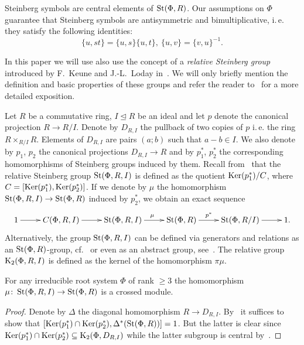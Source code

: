Steinberg symbols are central elements of $\operatorname{St}(\Phi, R)$.
Our assumptions on $\Phi$ guarantee that Steinberg symbols are antisymmetric and bimultiplicative, i.\,e. they satisfy the following identities:
\begin{equation} \label{eq:symbol-properties} \{ u, st \} = \{ u, s\} \{ u, t \}, \ \{ u, v \} = \{ v, u\}^{-1}. \end{equation}

In this paper we will use also use the concept of a \textit{relative Steinberg group} introduced by F.~Keune and J.-L.~Loday in~\cite{Ke78, Lo78}.
We will only briefly mention the definition and basic properties of these groups and refer the reader to~\cite[\S~2.3]{LS20} for a more detailed exposition.

Let $R$ be a commutative ring, $I \trianglelefteq R$ be an ideal and let $p$ denote the canonical projection $R \to R/I$.
Denote by $D_{R, I}$ the pullback of two copies of $p$ i.\,e. the ring $R \times_{R/I} R$.
Elements of $D_{R, I}$ are pairs $(a; b)$ such that $a-b \in I$.
We also denote by $p_1$, $p_2$ the canonical projections $D_{R, I} \to R$ and by $p_1^*$, $p_2^*$ the corresponding homomorphisms of Steinberg groups induced by them.
Recall from~\cite[Definition~2.5]{LS20} that the relative Steinberg group $\operatorname{St}(\Phi, R, I)$ is defined as the quotient
 $\operatorname{Ker}(p_1^*) / C$, where $C = [\operatorname{Ker}(p_1^*), \operatorname{Ker}(p_2^*)]$.
If we denote by $\mu$ the homomorphism $\operatorname{St}(\Phi, R, I) \to \operatorname{St}(\Phi, R)$ induced by $p_2^*$, we obtain an exact sequence
\begin{equation}
    \xymatrix{1 \ar[r] & C(\Phi, R, I) \ar[r] & \St(\Phi, R, I) \ar[r]^\mu & \St(\Phi, R) \ar[r]^-{p^*} & \St(\Phi, R/I) \ar[r] & 1. }\label{eq:relative-Steinberg}
\end{equation}
Alternatively, the group $\operatorname{St}(\Phi, R, I)$ can be defined via generators and relations as an $\operatorname{St}(\Phi, R)$-group, cf.~\cite[Proposition~6]{S15}
 or even as an abstract group, see~\cite{V22}.
The relative group $\operatorname{K}_2(\Phi, R, I)$ is defined as the kernel of the homomorphism $\pi \mu$.

\begin{lemma} \label{lem:rel-Steinberg-crossed-module}
For any irreducible root system $\Phi$ of rank $\geq 3$ the homomorphism $\mu \colon \operatorname{St}(\Phi, R, I) \to \operatorname{St}(\Phi, R)$ is a crossed module.
\end{lemma}
\begin{proof}
    Denote by $\Delta$ the diagonal homomorphism $R \to D_{R, I}.$
    By~\cite[Proposition~6]{Lo78} it suffices to show that $[\operatorname{Ker}(p_1^*) \cap \operatorname{Ker}(p_2^*), \Delta^*(\operatorname{St}(\Phi, R))] = 1$.
    But the latter is clear since $\operatorname{Ker}(p_1^*) \cap \operatorname{Ker}(p_2^*) \subseteq \operatorname{K}_2(\Phi, D_{R, I})$ while the latter subgroup is central by~\cite{LSV1}.
\end{proof}

